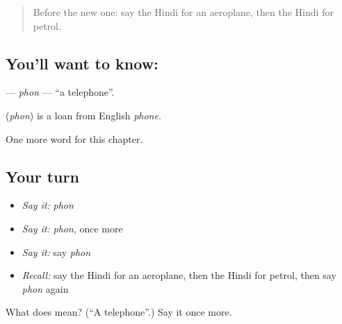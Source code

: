 \label{lesson:HI-C204-phon}



\begin{quote}
Before the new one: say the Hindi for an aeroplane, then the Hindi for petrol.
\end{quote}

\subsection*{You'll want to know: }
\textbf{} — \emph{phon} — \textquotedblleft{}a telephone\textquotedblright{}.

\begin{cousinweb}
\textbf{} (\emph{phon}) is a loan from English \emph{phone}.
\end{cousinweb}

\begin{grammarlens}[title={What you've built}]
One more word for this chapter.
\end{grammarlens}

\subsection*{Your turn}
\begin{itemize}
\raggedright
  \item \emph{Say it:} \emph{phon}
  \item \emph{Say it:} \emph{phon}, once more
  \item \emph{Say it:} say \emph{phon}
  \item \emph{Recall:} say the Hindi for an aeroplane, then the Hindi for petrol, then say \emph{phon} again
\end{itemize}

\begin{tcolorbox}[breakable,colback=teal!4,colframe=teal!35!black,title={Before you move on}]
What does  mean? (\textquotedblleft{}A telephone\textquotedblright{}.) Say it once more.
\end{tcolorbox}
